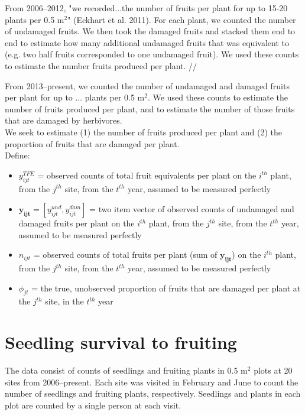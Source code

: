 \documentclass[12pt, oneside]{article}   	%
\begin{document}
From 2006--2012, "we recorded...the number of fruits per plant for up to 15-20 plants per 0.5 m$^2$" (Eckhart et al. 2011). For each plant, we counted the number of undamaged fruits. We then took the damaged fruits and stacked them end to end to estimate how many additional undamaged fruits that was equivalent to (e.g. two half fruits corresponded to one undamaged fruit). We used these counts to estimate the number fruits produced per plant. //

From 2013--present, we counted the number of undamaged and damaged fruits per plant for up to ... plants per 0.5 m$^2$. We used these counts to estimate the number of fruits produced per plant, and to estimate the number of those fruits that are damaged by herbivores. \\

We seek to estimate (1) the number of fruits produced per plant and (2) the proportion of fruits that are damaged per plant. \\

Define: 

\begin{itemize}

	\item $y^{TFE}_{ijt}$ = observed counts of total fruit equivalents per plant on the $i^{th}$ plant, from the $j^{th}$ site, from the $t^{th}$ year, assumed to be measured perfectly
	\item $\bm{y_{ijt}} = [ y^{und}_{ijt}, y^{dam}_{ijt} ] $ = two item vector of observed counts of undamaged and damaged fruits per plant on the $i^{th}$ plant, from the $j^{th}$ site, from the $t^{th}$ year, assumed to be measured perfectly
	\item $n_{ijt}$ = observed counts of total fruits per plant (sum of $\bm{y_{ijt}}$) on the $i^{th}$ plant, from the $j^{th}$ site, from the $t^{th}$ year, assumed to be measured perfectly
	\item $\phi_{jt}$ = the true, unobserved proportion of fruits that are damaged per plant at the $j^{th}$ site, in the $t^{th}$ year

\end{itemize}

\section*{Seedling survival to fruiting}

The data consist of counts of seedlings and fruiting plants in 0.5 m$^2$ plots at 20 sites from 2006--present. Each site was visited in February and June to count the number of seedlings and fruiting plants, respectively. Seedlings and plants in each plot are counted by a single person at each visit. \\
\end{document}
